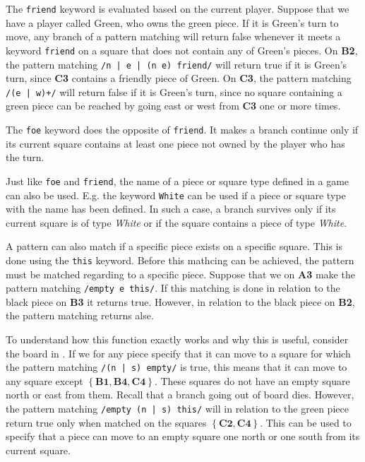The \texttt{friend} keyword is evaluated based on the current player. Suppose
that we have a player called Green, who owns the green piece. If it is Green's
turn to move, any branch of a pattern matching will return false whenever it
meets a keyword \texttt{friend} on a square that does not contain any of Green's
pieces. On \textbf{B2}, the pattern matching \texttt{/n | e | (n e) friend/}
will return true if it is Green's turn, since \textbf{C3} contains a friendly
piece of Green. On \textbf{C3}, the pattern matching \texttt{/(e | w)+/} will
return false if it is Green's turn, since no square containing a green piece can
be reached by going east or west from \textbf{C3} one or more times.

The \texttt{foe} keyword does the opposite of \texttt{friend}. It makes a branch
continue only if its current square contains at least one piece not owned by the
player who has the turn.

Just like \texttt{foe} and \texttt{friend}, the name of a piece or square type
defined in a \productname{} game can also be used. E.g. the keyword
\texttt{White} can be used if a piece or square type with the name has been
defined. In such a case, a branch survives only if its current square is of type
\textit{White} or if the square contains a piece of type \textit{White}.

A pattern can also match if a specific piece exists on a specific square. This
is done using the \texttt{this} keyword. Before this mathcing can be achieved,
the pattern must be matched regarding to a specific piece. Suppose that we on
\textbf{A3} make the pattern matching \texttt{/empty e this/}. If this matching
is done in relation to the black piece on \textbf{B3} it returns true. However,
in relation to the black piece on \textbf{B2}, the pattern matching returns
alse. 

To understand how this function exactly works and why this is useful, consider
the board in . If we for any piece specify that it can
move to a square for which the pattern matching \texttt{/(n | s) empty/} is
true, this means that it can move to any square except $\mathbf{\left\{B1, B4,
C4\right\}}$. These squares do not have an empty square north or east from them.
Recall that a branch going out of board dies.  However, the pattern matching
\texttt{/empty (n | s) this/} will in relation to the green piece return true
only when matched on the squares $\mathbf{\left\{ C2, C4\right\}}$.  This can be
used to specify that a piece can move to an empty square one north or one south
from its current square. 

